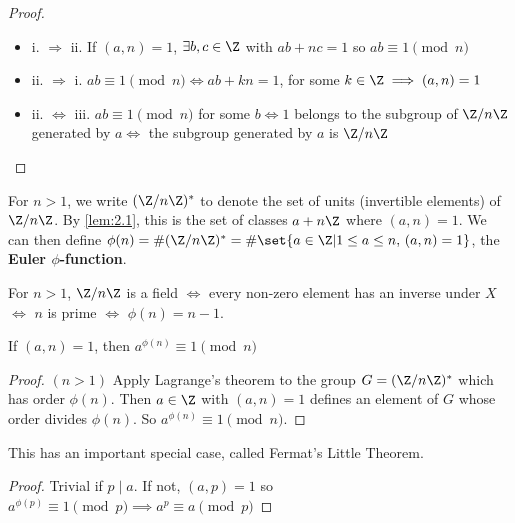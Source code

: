 \documentclass{article}
\begin{document}
\begin{proof}
    \leavevmode
    \begin{itemize}[label={}]
        \item i. $\Rightarrow$ ii. If $(a, n) = 1$, $\exists b, c \in \Z$ with $ab+nc=1$ so $ab \equiv 1 \pmod{n}$
        \item ii. $\Rightarrow$ i. $ab \equiv 1 \pmod{n} \iff ab+kn=1$, for some $k \in \Z \implies (a, n)= 1$
        \item ii. $\Leftrightarrow$ iii. $ab \equiv 1 \pmod{n}$ for some $b \iff 1$ belongs to the subgroup of $\Z / n \Z$ generated by $a \iff$ the subgroup generated by $a$ is $\Z / n \Z$
    \end{itemize}
\end{proof}

\begin{notation}
    For $n > 1$, we write $(\Z / n \Z)^*$ to denote the set of units (invertible elements) of $\Z / n \Z$. By \cref{lem:2.1}, this is the set of classes $a + n \Z$ where $(a, n) = 1$.
    We can then define $\phi(n) =\# (\Z / n \Z)^* = \# \set{a \in \Z | 1 \leq a \leq n, \, (a, n) = 1}$, the \textbf{Euler $\phi$-function}.
\end{notation}

\begin{remark}
    For $n>1$, $\Z/n\Z$ is a field $\iff$ every non-zero element has an inverse under $X$ $\iff$ $n$ is prime $\iff$ $\phi(n) = n-1$.
\end{remark}

\begin{thm}
    If $(a, n) = 1$, then $a^{\phi(n)} \equiv 1 \pmod{n}$
\end{thm}

\begin{proof}
    $(n>1)$ Apply Lagrange's theorem to the group $G = (\Z/n\Z)^*$ which has order $\phi(n)$. Then $a \in \Z$ with $(a, n) = 1$ defines an element of $G$ whose order divides $\phi(n)$. So $a^{\phi(n)} \equiv 1 \pmod{n}$.
\end{proof}

This has an important special case, called Fermat's Little Theorem.

\begin{proof}
    Trivial if $p \mid a$.  If not, $(a, p) = 1$ so $a^{\phi(p)} \equiv 1 \pmod{p} \implies a^p \equiv a \pmod{p}$
\end{proof}
\end{document}
